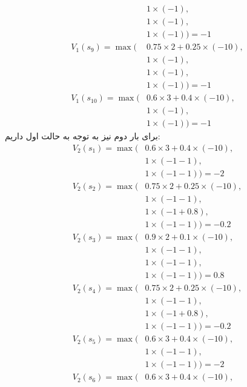 \begin{enumerate}
\begin{align*}
            &1 \times (-1),\\
            &1 \times (-1),\\
            &1 \times (-1)
        ) = -1\\
        V_1(s_9) = \max(
            &0.75 \times 2 + 0.25 \times (-10),\\
            &1 \times (-1),\\
            &1 \times (-1),\\
            &1 \times (-1)
        ) = -1\\
        V_1(s_{10}) = \max(
            &0.6 \times 3 + 0.4 \times (-10),\\
            &1 \times (-1),\\
            &1 \times (-1)
        ) = -1
    \end{align*}
    برای بار دوم نیز به توجه به حالت اول داریم:
    \begin{align*}
        V_2(s_1) = \max(
            &0.6 \times 3 + 0.4 \times (-10),\\
            &1 \times (-1 - 1),\\
            &1 \times (-1 - 1)
        ) = -2\\
        V_2(s_2) = \max(
            &0.75 \times 2 + 0.25 \times (-10),\\
            &1 \times (-1 - 1),\\
            &1 \times (-1 + 0.8),\\
            &1 \times (-1 - 1)
        ) = -0.2\\
        V_2(s_3) = \max(
            &0.9 \times 2 + 0.1 \times (-10),\\
            &1 \times (-1 - 1),\\
            &1 \times (-1 - 1),\\
            &1 \times (-1 - 1)
        ) = 0.8\\
        V_2(s_4) = \max(
            &0.75 \times 2 + 0.25 \times (-10),\\
            &1 \times (-1 - 1),\\
            &1 \times (-1 + 0.8),\\
            &1 \times (-1 - 1)
        ) = -0.2\\
        V_2(s_5) = \max(
            &0.6 \times 3 + 0.4 \times (-10),\\
            &1 \times (-1 - 1),\\
            &1 \times (-1 - 1)
        ) = -2\\
        V_2(s_6) = \max(
            &0.6 \times 3 + 0.4 \times (-10),\\

\end{align*}
\end{enumerate}
